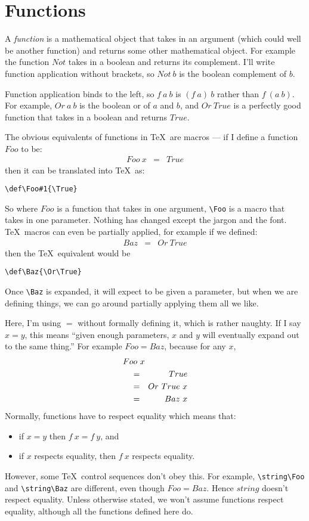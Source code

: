 \section{Functions}

A {\em function\/} is a mathematical object that takes in an argument
(which could well be another function) and returns some other mathematical
object.  For example the function $Not$ takes in a boolean and returns
its complement.  I'll write function application without brackets,
so $Not~b$ is the boolean complement of $b$.  

Function application
binds to the left, so $f~a~b$ is $(f~a)~b$ rather than $f~(a~b)$.
For example, $Or~a~b$ is the boolean or of $a$ and $b$, and
$Or~True$ is a perfectly good function that takes in a boolean
and returns $True$.

The obvious equivalents of functions in \TeX\ are macros ---
if I define a function $Foo$ to be:
\begin{eqnarray*}
   Foo~x  &  =  &  True
\end{eqnarray*}
then it can be translated into \TeX\ as:
\begin{verbatim}
\def\Foo#1{\True}
\end{verbatim}
So where $Foo$ is a function that takes in one argument, \verb|\Foo|
is a macro that takes in one parameter.  Nothing has changed except
the jargon and the font.  \TeX\ macros can even be partially applied,
for example if we defined:
\begin{eqnarray*}
   Baz  &  =  &  Or~True
\end{eqnarray*}
then the \TeX\ equivalent would be
\begin{verbatim}
\def\Baz{\Or\True}
\end{verbatim}
Once \verb|\Baz| is expanded, it will expect to be given a parameter,
but when we are defining things, we can go around partially applying
them all we like.

Here, I'm using $=$ without formally defining it, which is rather
naughty.  If I say $x = y$, this means 
``given enough parameters, $x$ and $y$ will eventually
expand out to the same thing.''  For example $Foo = Baz$, because
for any $x$,
\begin{eqnarray*}
   \start{Foo~x}
   &  =  &  True  \\
   &  =  &  Or~True~x  \\
   &  =  &  Baz~x
\end{eqnarray*}
Normally, functions have to {respect equality\/} which means that:
\begin{itemize}
\item if $x = y$ then $f~x = f~y$, and
\item if $x$ respects equality, then $f~x$ respects equality.
\end{itemize}
However, some \TeX\ control sequences don't obey this.  For example,
\verb|\string\Foo| and \verb|\string\Baz| are different, even though
$Foo = Baz$.  Hence $string$ doesn't respect equality.
Unless otherwise stated, we won't assume functions respect equality,
although all the functions defined here do.

